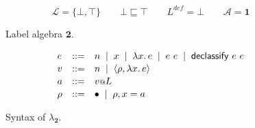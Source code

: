 \documentclass{article}
\makeatletter
\newcommand{\at}{\ensuremath{{\scriptstyle{@}}}}
\theoremstyle{definition}
\makeatother
\begin{document}
\thispagestyle{fancy}

\begin{figure}[ht]
  \centering
  \[
  \mathcal{L} = \{ \bot, \top \}
  \qquad
  \bot \sqsubseteq \top
  \qquad
  L^{\mathit{def}} = \bot
  \qquad
  \mathcal{A} = \mathbf{1}
  \]
  \caption{Label algebra $\mathbf{2}$.}
  \label{fig:two}
\end{figure}

\begin{figure}[ht]
  \centering
  \[
  \begin{array}[t]{lcl}
    e & ::= &
    n\;\; |\;\;
    x\;\; |\;\;
    \lambda{x}.\, e\;\; |\;\;
    e\ e\;\; |\;\;
    \mathsf{declassify}\ e\ e
    \\[0.3ex]
    v & ::= &
    n\;\; |\;\;
    \langle{\rho, \lambda{x}.\, e\rangle}
    \\[0.3ex]
    a & ::= &
    v \at L
    \\[0.3ex]
    \rho & ::= &
    \bullet\;\; |\;\;
    \rho, x = a
  \end{array}
  \]
  \caption{Syntax of $\lambda_{\mathbf{2}}$.}
  \label{fig:syntax}
\end{figure}
\end{document}
